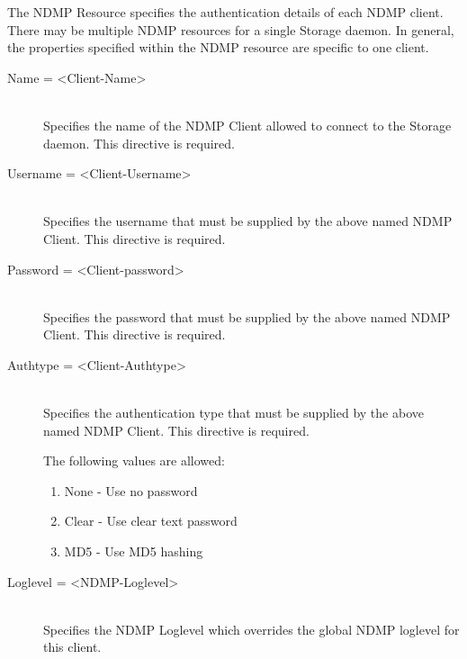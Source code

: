 The NDMP Resource specifies the authentication details of each NDMP client.
There may be multiple NDMP resources for a single Storage daemon. In general,
the properties specified within the NDMP resource are specific to one client.

\begin{description}

\item [Name = {\textless}Client-Name{\textgreater}] \hfill \\
Specifies the name of the NDMP Client allowed to connect to the Storage daemon.
This directive is required.

\item [Username = {\textless}Client-Username{\textgreater}] \hfill \\
Specifies the username that must be supplied by the above named NDMP Client.
This directive is required.

\item [Password = {\textless}Client-password{\textgreater}] \hfill \\
Specifies the password that must be supplied by the above named NDMP Client.
This directive is required.

\item [Authtype = {\textless}Client-Authtype{\textgreater}] \hfill \\
Specifies the authentication type that must be supplied by the above named NDMP Client.
This directive is required.

The following values are allowed:
\begin{enumerate}
\item None - Use no password
\item Clear - Use clear text password
\item MD5 - Use MD5 hashing
\end{enumerate}

\item [Loglevel = {\textless}NDMP-Loglevel{\textgreater}] \hfill \\
Specifies the NDMP Loglevel which overrides the global NDMP loglevel for this client.

\end{description}

\label{DeviceResource}
